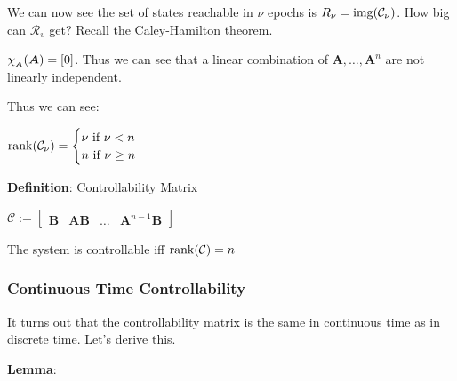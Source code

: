\documentclass[11pt]{article}
\begin{document}
  \vspace{12pt}

  We can now see the set of states reachable in \(\nu\) epochs is \(R_{\nu} = \mathrm{img}{\left( \mathcal{C}_{\nu} \right)}\).
  How big can \(\mathcal{R}_v\) get? Recall the Caley-Hamilton theorem.

  \(\chi_{_{\bm{A}}}(\bm{A}) = [0]\). Thus we can see that a linear combination of \(\bm{A}, \dots, \bm{A}^n\) are
  not linearly independent.

  \vspace{12pt}

  Thus we can see:

  \(\rank(\mathcal{C}_{\nu}) =
  \begin{cases}
     \nu \textrm{ if } \nu < n \\
     n \textrm{ if } \nu \ge n \\
  \end{cases}\)

  \textbf{Definition}: Controllability Matrix

  \(\mathcal{C} := \begin{bmatrix} \bm{B} & \bm{AB} & \dots & \bm{A}^{n - 1}\bm{B}\end{bmatrix}\)

  The system is controllable iff \(\rank(\mathcal{C}) = n\)

  \pagebreak

  \subsubsection{Continuous Time Controllability}

  It turns out that the controllability matrix is the same in continuous time as in discrete time.
  Let's derive this.

  \textbf{Lemma}:
\end{document}
